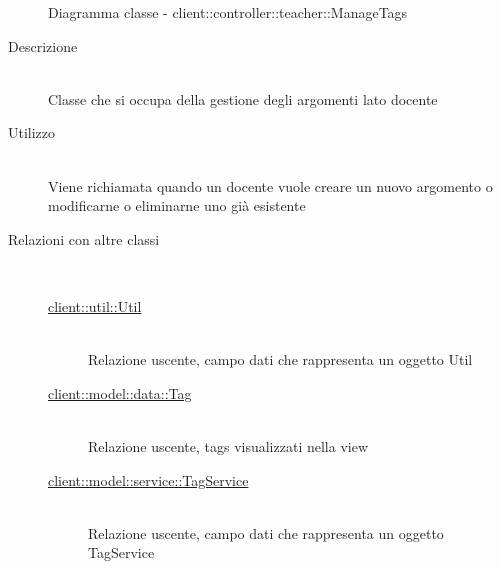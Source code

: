 \vspace{0.5cm}
\hypertarget{client::controller::teacher::ManageTags}{}
\begin{figure}[H]
	\centering
	\caption{Diagramma classe - client::controller::teacher::ManageTags}
\end{figure}\begin{description}
\item[Descrizione] \hfill \\
Classe che si occupa della gestione degli argomenti lato docente
\item[Utilizzo] \hfill \\
Viene richiamata quando un docente vuole creare un nuovo argomento o modificarne o eliminarne uno già esistente
\item[Relazioni con altre classi] \hfill \\
\vspace{-7mm}
\begin{description}
	\item[\hyperlink{client::util::Util}{client::util::Util}] \hfill \\
	Relazione uscente, campo dati che rappresenta un oggetto Util
	\item[\hyperlink{client::model::data::Tag}{client::model::data::Tag}] \hfill \\
	Relazione uscente, tags visualizzati nella view
	\item[\hyperlink{client::model::service::TagService}{client::model::service::TagService}] \hfill \\
	Relazione uscente, campo dati che rappresenta un oggetto TagService
\end{description}


\end{description}

